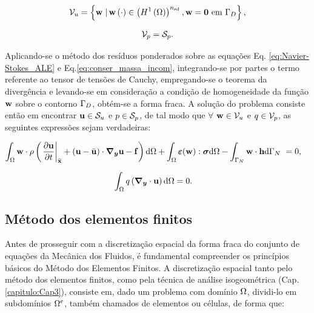 \documentclass[tese_patricia]{subfiles}%
\begin{document}
\begin{align}
\mathcal{V}_u = \left\{\mathbf{w} \left . \right| \mathbf{w} \left(\cdot\right) \in \left(H^{1}\left(\Omega\right)\right)^{{n_{\mathrm{sd}}}}, \mathbf{w} = \mathbf{0} \textrm { em} \ \Gamma_{D} \right\},
\end{align}


\begin{align}
\mathcal{V}_p = \mathcal{S}_p.
\end{align}

Aplicando-se o método dos resíduos ponderados sobre as equações Eq. \eqref{eq:Navier-Stokes_ALE} e Eq.\eqref{eq:conser_massa_incom}, integrando-se por partes o termo referente ao tensor de tensões de Cauchy, empregando-se o teorema da divergência e levando-se em consideração a condição de homogeneidade da função $\mathbf{w}$ sobre o contorno $\Gamma_{D}$, obtém-se a forma fraca. A solução do problema consiste então em encontrar $\mathbf{u} \in \mathcal{S}_u$ e $p \in \mathcal{S}_p$, de tal modo que $\forall$ $\mathbf{w} \in \mathcal{V}_u$ e $q \in \mathcal{V}_p$, as seguintes expressões sejam verdadeiras:


\begin{align}
\int_{\Omega} \mathbf{w} \cdot \rho  \left(\left . \frac{\partial\mathbf{u}}{\partial t} \right|_{\bar{\mathbf{x}}} + \left(\mathbf{u} - \bar{\mathbf{u}} \right)\cdot\boldsymbol{\nabla_y} \mathbf{u} - \mathbf{f} \right) \mathrm{d} \Omega + \int_{\Omega} \bm{\varepsilon}(\mathbf{w}) : \boldsymbol{\sigma}  \mathrm{d} \Omega - \int_{\Gamma_{N}} \mathbf{w} \cdot \mathbf{h} \mathrm{d}\Gamma_{N}  \  &= 0,  \label{eq:QM_forma_fraca_0_cap2} 
\end{align}

\begin{align}
\int_{\Omega} q \left(\boldsymbol{\nabla_y} \cdot \mathbf{u}\right) \mathrm{d} \Omega &= 0. \label{eq:C_forma_fraca_0_cap2} 
\end{align}


\subsection{Método dos elementos finitos }

Antes de prosseguir com a discretização espacial da forma fraca do conjunto de equações da Mecânica dos Fluidos, é fundamental compreender os princípios básicos do Método dos Elementos Finitos.  A discretização espacial tanto pelo método dos elementos finitos, como pela técnica de análise isogeométrica (Cap. \ref{capitulo:Cap3}), consiste em, dado um problema com domínio $\Omega$, dividi-lo em subdomínios $\Omega^e$, também chamados de elementos ou células, de forma que:
\end{document}
